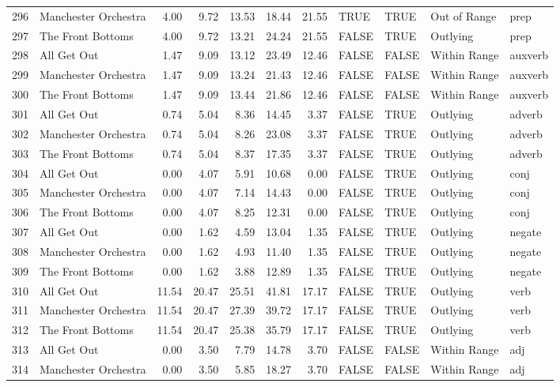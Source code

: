 \begin{table}[ht]
\begin{tabular}{rlrrrrrllll}
  296 & Manchester Orchestra & 4.00 & 9.72 & 13.53 & 18.44 & 21.55 & TRUE & TRUE & Out of Range & prep \\ 
  297 & The Front Bottoms & 4.00 & 9.72 & 13.21 & 24.24 & 21.55 & FALSE & TRUE & Outlying & prep \\ 
  298 & All Get Out & 1.47 & 9.09 & 13.12 & 23.49 & 12.46 & FALSE & FALSE & Within Range & auxverb \\ 
  299 & Manchester Orchestra & 1.47 & 9.09 & 13.24 & 21.43 & 12.46 & FALSE & FALSE & Within Range & auxverb \\ 
  300 & The Front Bottoms & 1.47 & 9.09 & 13.44 & 21.86 & 12.46 & FALSE & FALSE & Within Range & auxverb \\ 
  301 & All Get Out & 0.74 & 5.04 & 8.36 & 14.45 & 3.37 & FALSE & TRUE & Outlying & adverb \\ 
  302 & Manchester Orchestra & 0.74 & 5.04 & 8.26 & 23.08 & 3.37 & FALSE & TRUE & Outlying & adverb \\ 
  303 & The Front Bottoms & 0.74 & 5.04 & 8.37 & 17.35 & 3.37 & FALSE & TRUE & Outlying & adverb \\ 
  304 & All Get Out & 0.00 & 4.07 & 5.91 & 10.68 & 0.00 & FALSE & TRUE & Outlying & conj \\ 
  305 & Manchester Orchestra & 0.00 & 4.07 & 7.14 & 14.43 & 0.00 & FALSE & TRUE & Outlying & conj \\ 
  306 & The Front Bottoms & 0.00 & 4.07 & 8.25 & 12.31 & 0.00 & FALSE & TRUE & Outlying & conj \\ 
  307 & All Get Out & 0.00 & 1.62 & 4.59 & 13.04 & 1.35 & FALSE & TRUE & Outlying & negate \\ 
  308 & Manchester Orchestra & 0.00 & 1.62 & 4.93 & 11.40 & 1.35 & FALSE & TRUE & Outlying & negate \\ 
  309 & The Front Bottoms & 0.00 & 1.62 & 3.88 & 12.89 & 1.35 & FALSE & TRUE & Outlying & negate \\ 
  310 & All Get Out & 11.54 & 20.47 & 25.51 & 41.81 & 17.17 & FALSE & TRUE & Outlying & verb \\ 
  311 & Manchester Orchestra & 11.54 & 20.47 & 27.39 & 39.72 & 17.17 & FALSE & TRUE & Outlying & verb \\ 
  312 & The Front Bottoms & 11.54 & 20.47 & 25.38 & 35.79 & 17.17 & FALSE & TRUE & Outlying & verb \\ 
  313 & All Get Out & 0.00 & 3.50 & 7.79 & 14.78 & 3.70 & FALSE & FALSE & Within Range & adj \\ 
  314 & Manchester Orchestra & 0.00 & 3.50 & 5.85 & 18.27 & 3.70 & FALSE & FALSE & Within Range & adj \\ 

\end{tabular}
\end{table}
